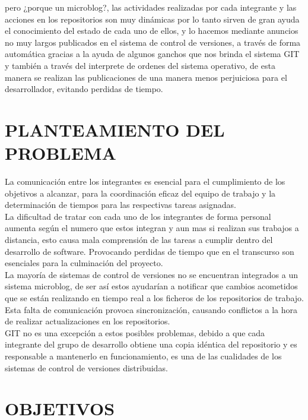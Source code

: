 pero ¿porque un microblog?, las actividades realizadas por cada integrante y las acciones en los repositorios son muy dinámicas por lo tanto sirven de gran ayuda el conocimiento del estado de cada uno de ellos, y lo hacemos mediante anuncios no muy largos publicados en el sistema de control de versiones, a través de forma automática gracias a la ayuda de algunos ganchos que nos brinda el sistema GIT y también a través del interprete de ordenes del sistema operativo, de esta manera se realizan las publicaciones de una manera menos perjuiciosa para el desarrollador, evitando perdidas de tiempo.\\

\section{PLANTEAMIENTO DEL PROBLEMA}

La comunicación entre los integrantes es esencial para el cumplimiento de los objetivos a alcanzar, para la coordinación eficaz del equipo de trabajo y la determinación de tiempos para las respectivas tareas asignadas.\\

La dificultad de tratar con cada uno de los integrantes de forma personal aumenta según el numero que estos integran y aun mas si realizan sus trabajos a distancia, esto causa mala comprensión de las tareas a cumplir dentro del desarrollo de software. Provocando perdidas de tiempo que en el transcurso son esenciales para la culminación del proyecto.\\

La mayoría de sistemas de control de versiones no se encuentran integrados a un sistema microblog, de ser así estos ayudarían a notificar que cambios acometidos que se están realizando en tiempo real a los ficheros de los repositorios de trabajo. Esta falta de comunicación provoca sincronización, causando conflictos a la hora de realizar actualizaciones en los repositorios.\\

GIT no es una excepción a estos posibles problemas, debido a que cada integrante del grupo de desarrollo obtiene una copia idéntica del repositorio y es responsable a mantenerlo en funcionamiento, es una de las cualidades de los sistemas de control de versiones distribuidas.\\

\section{OBJETIVOS}
